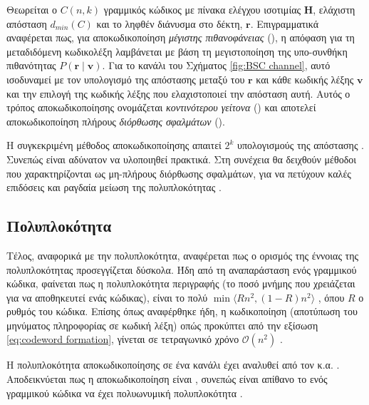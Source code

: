 Θεωρείται ο $C(n,k)$ γραμμικός  κώδικος με πίνακα ελέγχου ισοτιμίας $\mathbf{H}$, ελάχιστη απόσταση $d_{min}(C)$ και το ληφθέν διάνυσμα στο δέκτη, $\mathbf{r}$. Επιγραμματικά αναφέρεται πως, για αποκωδικοποίηση \textit{μέγιστης πιθανοφάνειας} (), η απόφαση για τη μεταδιδόμενη κωδικολέξη λαμβάνεται με βάση τη μεγιστοποίηση της υπο-συνθήκη πιθανότητας $P(\mathbf{r}\mid\mathbf{v})$. Για το κανάλι  του Σχήματος \ref{fig:BSC channel}, αυτό ισοδυναμεί με τον υπολογισμό της απόστασης μεταξύ του $\mathbf{r}$ και κάθε κωδικής λέξης $\mathbf{v}$ και την επιλογή της κωδικής λέξης που ελαχιστοποιεί την απόσταση αυτή. Αυτός ο τρόπος αποκωδικοποίησης ονομάζεται \textit{κοντινότερου γείτονα} () και αποτελεί αποκωδικοποίηση πλήρους \textit{διόρθωσης σφαλμάτων} ().

Η συγκεκριμένη μέθοδος αποκωδικοποίησης απαιτεί $2^k$ υπολογισμούς της απόστασης . Συνεπώς είναι αδύνατον να υλοποιηθεί πρακτικά. Στη συνέχεια θα δειχθούν μέθοδοι που χαρακτηρίζονται ως μη-πλήρους διόρθωσης σφαλμάτων, για να πετύχουν καλές επιδόσεις και ραγδαία μείωση της πολυπλοκότητας \cite{ryan2009channel}.

\subsection{Πολυπλοκότητα}

Τέλος, αναφορικά με την πολυπλοκότητα, αναφέρεται πως ο ορισμός της έννοιας της πολυπλοκότητας προσεγγίζεται δύσκολα. Ήδη από τη αναπαράσταση ενός γραμμικού  κώδικα, φαίνεται πως η πολυπλοκότητα περιγραφής (το ποσό μνήμης που χρειάζεται για να αποθηκευτεί ενάς κώδικας), είναι το πολύ $\min\langle Rn^2, \left(1-R\right)n^2\rangle$ , όπου $R$ ο ρυθμός του κώδικα. Επίσης όπως αναφέρθηκε ήδη, η κωδικοποίηση (αποτύπωση του μηνύματος πληροφορίας σε κωδική λέξη) οπώς προκύπτει από την εξίσωση \ref{eq:codeword formation}, γίνεται σε τετραγωνικό χρόνο $\mathcal{O}(n^2)$ \cite{richardson2008modern}.

Η πολυπλοκότητα αποκωδικοποίησης  σε ένα κανάλι  έχει αναλυθεί από τον  κ.α. \cite{berlekamp1978inherent}. Αποδεικνύεται πως η  αποκωδικοποίηση είναι , συνεπώς είναι απίθανο το  ενός γραμμικού  κώδικα να έχει πολυωνυμική πολυπλοκότητα \cite{bruck1990hardness}.


